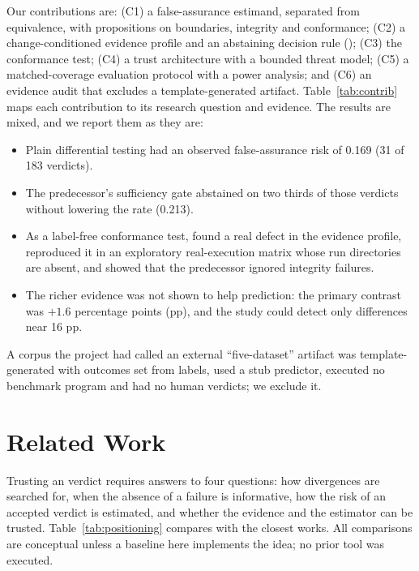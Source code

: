 \documentclass{ieeeaccess}
\begin{document}
Our contributions are: (C1) a false-assurance estimand, separated from equivalence, with propositions on boundaries, integrity and conformance; (C2) a change-conditioned evidence profile and an abstaining decision rule (\cec{}); (C3) the \ers{} conformance test; (C4) a trust architecture with a bounded threat model; (C5) a matched-coverage evaluation protocol with a power analysis; and (C6) an evidence audit that excludes a template-generated artifact. Table~\ref{tab:contrib} maps each contribution to its research question and evidence. The results are mixed, and we report them as they are:
\begin{itemize}
\item Plain differential testing had an observed false-assurance risk of 0.169 (31 of 183 \NDO{} verdicts).
\item The predecessor's sufficiency gate abstained on two thirds of those verdicts without lowering the rate (0.213).
\item As a label-free conformance test, \ers{} found a real defect in the evidence profile, reproduced it in an exploratory real-execution matrix whose run directories are absent, and showed that the predecessor ignored integrity failures.
\item The richer evidence was not shown to help prediction: the primary contrast was $+1.6$ percentage points (pp), and the study could detect only differences near 16 pp.
\end{itemize}
A corpus the project had called an external ``five-dataset'' artifact was template-generated with outcomes set from labels, used a stub predictor, executed no benchmark program and had no human verdicts; we exclude it.



\section{Related Work}\label{sec:background}
Trusting an \NDO{} verdict requires answers to four questions: how divergences are searched for, when the absence of a failure is informative, how the risk of an accepted verdict is estimated, and whether the evidence and the estimator can be trusted. Table~\ref{tab:positioning} compares \sbg{} with the closest works. All comparisons are conceptual unless a baseline here implements the idea; no prior tool was executed.
\end{document}
